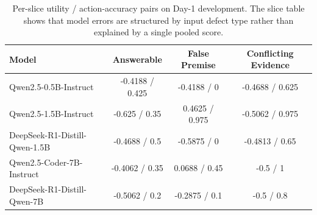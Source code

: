 \begin{table}[t]
\centering
\small
\setlength{\tabcolsep}{4.0pt}
\begin{tabular}{lccc}
\toprule
Model & Answerable & False Premise & Conflicting Evidence \\
\midrule
Qwen2.5-0.5B-Instruct & -0.4188 / 0.425 & -0.4188 / 0 & -0.4688 / 0.625 \\
Qwen2.5-1.5B-Instruct & -0.625 / 0.35 & 0.4625 / 0.975 & -0.5062 / 0.975 \\
DeepSeek-R1-Distill-Qwen-1.5B & -0.4688 / 0.5 & -0.5875 / 0 & -0.4813 / 0.65 \\
Qwen2.5-Coder-7B-Instruct & -0.4062 / 0.35 & 0.0688 / 0.45 & -0.5 / 1 \\
DeepSeek-R1-Distill-Qwen-7B & -0.5062 / 0.2 & -0.2875 / 0.1 & -0.5 / 0.8 \\
\bottomrule
\end{tabular}
\caption{Per-slice utility / action-accuracy pairs on Day-1 development. The slice table shows that model errors are structured by input defect type rather than explained by a single pooled score.}
\label{tab:day1-scale-reasoning-slices}
\end{table}
